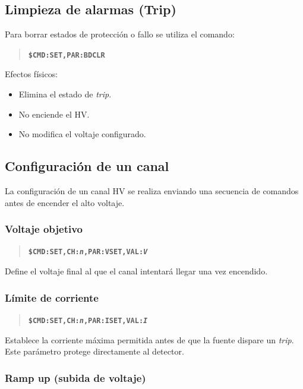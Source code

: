 \documentclass{article}
\begin{document}
\subsection{Limpieza de alarmas (Trip)}

Para borrar estados de protección o fallo se utiliza el comando:

\begin{quote}
\textbf{\texttt{\$CMD:SET,PAR:BDCLR}}
\end{quote}

Efectos físicos:
\begin{itemize}
    \item Elimina el estado de \emph{trip}.
    \item No enciende el HV.
    \item No modifica el voltaje configurado.
\end{itemize}

\subsection{Configuración de un canal}

La configuración de un canal HV se realiza enviando una secuencia de comandos antes de encender el alto voltaje.

\subsubsection{Voltaje objetivo}

\begin{quote}
\textbf{\texttt{\$CMD:SET,CH:\emph{n},PAR:VSET,VAL:\emph{V}}}
\end{quote}

Define el voltaje final al que el canal intentará llegar una vez encendido.

\subsubsection{Límite de corriente}

\begin{quote}
\textbf{\texttt{\$CMD:SET,CH:\emph{n},PAR:ISET,VAL:\emph{I}}}
\end{quote}

Establece la corriente máxima permitida antes de que la fuente dispare un \emph{trip}.  
Este parámetro protege directamente al detector.

\subsubsection{Ramp up (subida de voltaje)}
\end{document}
